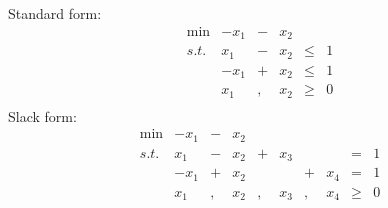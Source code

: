 {{		\begin{small}
			Standard form:
			\[
			\begin{array}{rrrrrrl}
			\min & - x_1 & - & x_2 & \\
			s.t. &   x_1 & - & x_2 & \leq & 1   \\
			& - x_1 & + & x_2 & \leq & 1   \\
			&   x_1 &,  & x_2 & \geq & 0   \\
			\end{array} \nonumber
			\]
			Slack form:
			\[
			\begin{array}{rrrrrrrrrl}
			\min & - x_1 &-& x_2   \\
			s.t. &   x_1 &-& x_2 &+& x_3 & &     & = & 1   \\
			& - x_1 &+& x_2 & &     &+& x_4 & = & 1   \\
			&   x_1 &,& x_2 &,& x_3 &,& x_4 &\geq & 0 \\
			\end{array} \nonumber
			\]
		\end{small}

}}
